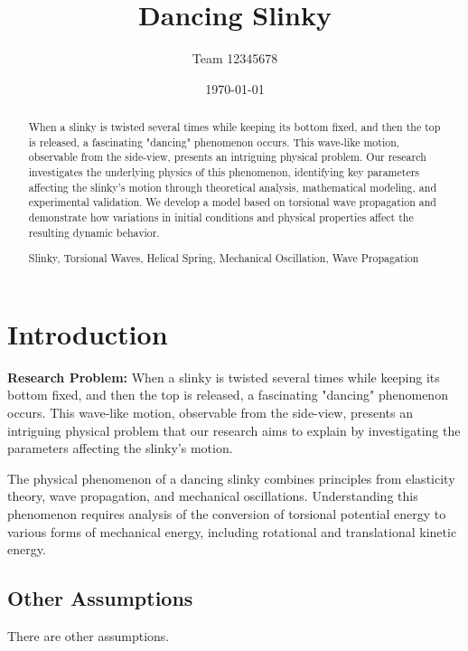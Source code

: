 \documentclass{mcmthesis}  %
\title{Dancing Slinky}  %
\author{\small Team 12345678}  %
\date{\today}  %
\begin{document}
\begin{abstract}  %
When a slinky is twisted several times while keeping its bottom fixed, and then the top is released, a fascinating "dancing" phenomenon occurs. This wave-like motion, observable from the side-view, presents an intriguing physical problem. Our research investigates the underlying physics of this phenomenon, identifying key parameters affecting the slinky's motion through theoretical analysis, mathematical modeling, and experimental validation. We develop a model based on torsional wave propagation and demonstrate how variations in initial conditions and physical properties affect the resulting dynamic behavior.
\begin{keywords}
Slinky, Torsional Waves, Helical Spring, Mechanical Oscillation, Wave Propagation
\end{keywords}
\end{abstract}  %
\maketitle  %

\tableofcontents  %


\newpage  %
\section{Introduction}  %

\textbf{Research Problem:} When a slinky is twisted several times while keeping its bottom fixed, and then the top is released, a fascinating "dancing" phenomenon occurs. This wave-like motion, observable from the side-view, presents an intriguing physical problem that our research aims to explain by investigating the parameters affecting the slinky's motion.

The physical phenomenon of a dancing slinky combines principles from elasticity theory, wave propagation, and mechanical oscillations. Understanding this phenomenon requires analysis of the conversion of torsional potential energy to various forms of mechanical energy, including rotational and translational kinetic energy.

\subsection{Other Assumptions}  %
There are other assumptions.
\end{document}
